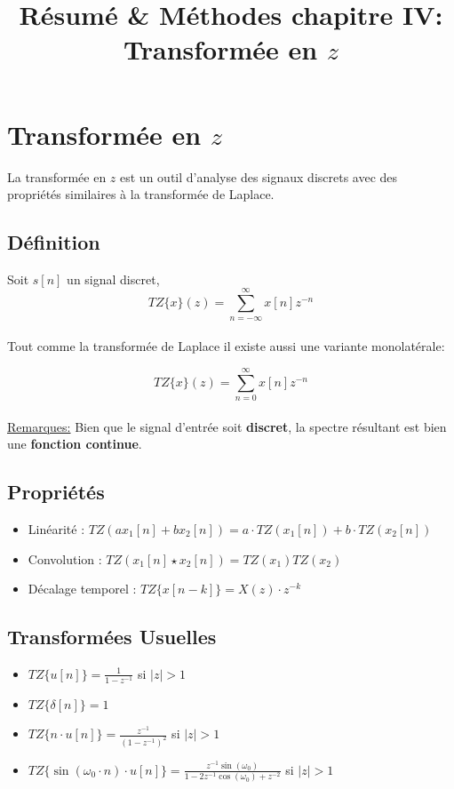\documentclass[11pt,a4paper]{article}
\begin{document}
\title{Résumé \& Méthodes chapitre IV: Transformée en $z$}
\maketitle
\section{Transformée en $z$}
La transformée en $z$ est un outil d'analyse des signaux discrets avec des propriétés similaires à la transformée de Laplace.
\subsection{Définition}
Soit $s[n]$ un signal discret, \\
\[\boxed{TZ\{ x \}(z) = \sum_{n = -\infty}^{\infty} x[n] z^{-n}} \]
\\
Tout comme la transformée de Laplace il existe aussi une variante monolatérale:

\[TZ\{ x \}(z) = \sum_{n = 0}^{\infty} x[n] z^{-n} \]\\

\underline{Remarques:} Bien que le signal d'entrée soit \textbf{discret}, la spectre résultant est bien une \textbf{fonction continue}.

\subsection{Propriétés}
\begin{itemize}
\item Linéarité : $TZ(a x_1[n] + b x_2[n]) = a\cdot TZ (x_1[n]) + b\cdot TZ(x_2[n])$
\vspace{0.3cm}
\item Convolution : $TZ(x_1[n] \star x_2[n]) = TZ(x_1) TZ(x_2)$
\vspace{0.3cm}
\item Décalage temporel : $ TZ\{x[n-k]\} = X(z)\cdot z^{-k} $
\end{itemize}
\vspace{0.3cm}

\subsection{Transformées Usuelles}
\begin{itemize}
\item $TZ\{ u[n] \}  = \frac{\displaystyle 1}{\displaystyle 1-z^{-1}}$ si $|z|>1$
\item $TZ\{ \delta [n] \}  = 1$
\item $TZ\{ n\cdot u[n] \} = \frac{\displaystyle z^{-1}}{\displaystyle (1-z^{-1})^2}$ si $|z|>1$
\item $TZ\{ \sin(\omega_0 \cdot n )\cdot u [n] \}  = \frac{\displaystyle z^{-1} \sin(\omega_0)}{\displaystyle 1-2z^{-1} \cos(\omega_0) +z^{-2}}$ si $|z|>1$
\end{itemize}
\end{document}
